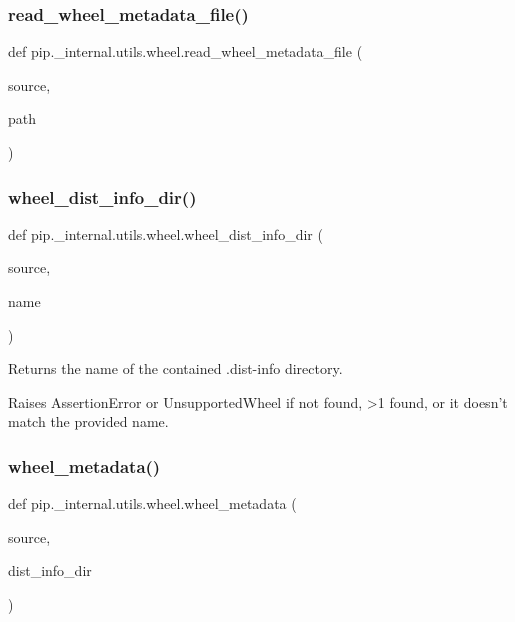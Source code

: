 \subsubsection{\texorpdfstring{read\+\_\+wheel\+\_\+metadata\+\_\+file()}{read\_wheel\_metadata\_file()}}
{\footnotesize\ttfamily def pip.\+\_\+internal.\+utils.\+wheel.\+read\+\_\+wheel\+\_\+metadata\+\_\+file (\begin{DoxyParamCaption}\item[{}]{source,  }\item[{}]{path }\end{DoxyParamCaption})}

\mbox{\label{namespacepip_1_1__internal_1_1utils_1_1wheel_a6236368c0d4b0921172e561d40294582}} 
\subsubsection{\texorpdfstring{wheel\+\_\+dist\+\_\+info\+\_\+dir()}{wheel\_dist\_info\_dir()}}
{\footnotesize\ttfamily def pip.\+\_\+internal.\+utils.\+wheel.\+wheel\+\_\+dist\+\_\+info\+\_\+dir (\begin{DoxyParamCaption}\item[{}]{source,  }\item[{}]{name }\end{DoxyParamCaption})}

\begin{DoxyVerb}Returns the name of the contained .dist-info directory.

Raises AssertionError or UnsupportedWheel if not found, >1 found, or
it doesn't match the provided name.
\end{DoxyVerb}
 \mbox{\label{namespacepip_1_1__internal_1_1utils_1_1wheel_a37434d5e8d89e95220dba4bffd2fc26e}} 
\subsubsection{\texorpdfstring{wheel\+\_\+metadata()}{wheel\_metadata()}}
{\footnotesize\ttfamily def pip.\+\_\+internal.\+utils.\+wheel.\+wheel\+\_\+metadata (\begin{DoxyParamCaption}\item[{}]{source,  }\item[{}]{dist\+\_\+info\+\_\+dir }\end{DoxyParamCaption})}

